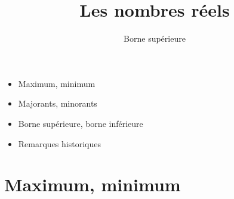 










\title{{\bf Les nombres réels}}
\subtitle{Borne supérieure}

\begin{frame}
  
  \debutmontitre

  \pause

{\footnotesize
\hfill
{}
\begin{minipage}{0.6\textwidth}
  \begin{itemize}
    \item<3-> Maximum, minimum
    \item<4-> Majorants, minorants
    \item<5-> Borne supérieure, borne inférieure
    \item<6-> Remarques historiques
  \end{itemize}
\end{minipage}
}

\end{frame}

\setcounter{framenumber}{0}


\section*{Maximum, minimum}

